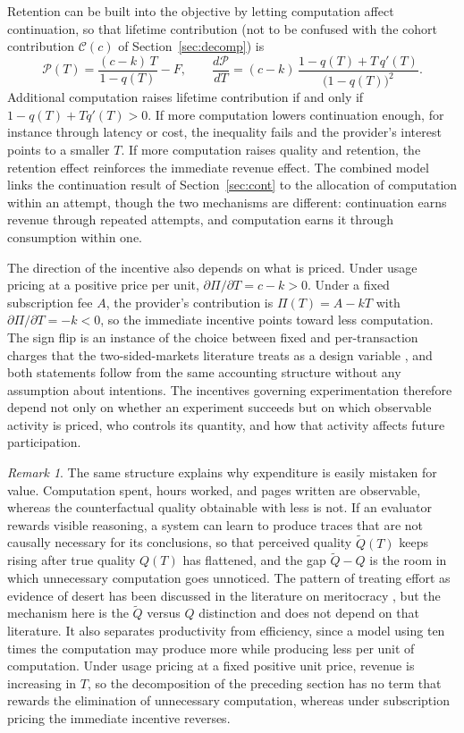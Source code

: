 \documentclass[11pt]{article}
\theoremstyle{remark}
\newtheorem{remark}{Remark}
\begin{document}
Retention can be built into the objective by letting computation affect continuation, so that lifetime contribution (not to be confused with the cohort contribution $\mathcal C(c)$ of Section~\ref{sec:decomp}) is
\[
\mathcal{P}(T)=\frac{(c-k)\,T}{1-q(T)}-F,
\qquad
\frac{d\mathcal{P}}{dT}=(c-k)\,\frac{1-q(T)+T\,q'(T)}{\bigl(1-q(T)\bigr)^{2}} .
\]
Additional computation raises lifetime contribution if and only if $1-q(T)+Tq'(T)>0$. If more computation lowers continuation enough, for instance through latency or cost, the inequality fails and the provider's interest points to a smaller $T$. If more computation raises quality and retention, the retention effect reinforces the immediate revenue effect. The combined model links the continuation result of Section~\ref{sec:cont} to the allocation of computation within an attempt, though the two mechanisms are different: continuation earns revenue through repeated attempts, and computation earns it through consumption within one.

The direction of the incentive also depends on what is priced. Under usage pricing at a positive price per unit, $\partial\Pi/\partial T=c-k>0$. Under a fixed subscription fee $A$, the provider's contribution is $\Pi(T)=A-kT$ with $\partial\Pi/\partial T=-k<0$, so the immediate incentive points toward less computation. The sign flip is an instance of the choice between fixed and per-transaction charges that the two-sided-markets literature treats as a design variable \cite{rochet2006,armstrong2006}, and both statements follow from the same accounting structure without any assumption about intentions. The incentives governing experimentation therefore depend not only on whether an experiment succeeds but on which observable activity is priced, who controls its quantity, and how that activity affects future participation.

\begin{remark}
The same structure explains why expenditure is easily mistaken for value. Computation spent, hours worked, and pages written are observable, whereas the counterfactual quality obtainable with less is not. If an evaluator rewards visible reasoning, a system can learn to produce traces that are not causally necessary for its conclusions, so that perceived quality $\tilde Q(T)$ keeps rising after true quality $Q(T)$ has flattened, and the gap $\tilde Q-Q$ is the room in which unnecessary computation goes unnoticed. The pattern of treating effort as evidence of desert has been discussed in the literature on meritocracy \cite{sandel2020}, but the mechanism here is the $\tilde Q$ versus $Q$ distinction and does not depend on that literature. It also separates productivity from efficiency, since a model using ten times the computation may produce more while producing less per unit of computation. Under usage pricing at a fixed positive unit price, revenue is increasing in $T$, so the decomposition of the preceding section has no term that rewards the elimination of unnecessary computation, whereas under subscription pricing the immediate incentive reverses.
\end{remark}
\end{document}
